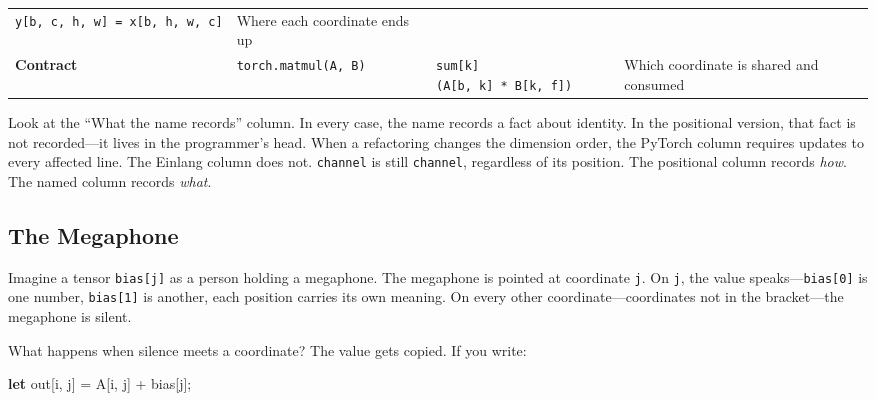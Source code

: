 \documentclass[11pt,titlepage]{article}
\newenvironment{Shaded}{}{}
\newcommand{\KeywordTok}[1]{\textcolor[rgb]{0.00,0.44,0.13}{\textbf{#1}}}
\newcommand{\NormalTok}[1]{#1}
\newcommand{\OperatorTok}[1]{\textcolor[rgb]{0.40,0.40,0.40}{#1}}
\begin{document}
\begin{longtable}[]{@{}llll@{}}
\begin{minipage}[t]{0.22\columnwidth}
\texttt{y{[}b,\ c,\ h,\ w{]}\ =\ x{[}b,\ h,\ w,\ c{]}}\strut
\end{minipage} & \begin{minipage}[t]{0.22\columnwidth}\raggedright
Where each coordinate ends up\strut
\end{minipage}\tabularnewline
\begin{minipage}[t]{0.22\columnwidth}\raggedright
\textbf{Contract}\strut
\end{minipage} & \begin{minipage}[t]{0.22\columnwidth}\raggedright
\texttt{torch.matmul(A,\ B)}\strut
\end{minipage} & \begin{minipage}[t]{0.22\columnwidth}\raggedright
\texttt{sum{[}k{]}(A{[}b,\ k{]}\ *\ B{[}k,\ f{]})}\strut
\end{minipage} & \begin{minipage}[t]{0.22\columnwidth}\raggedright
Which coordinate is shared and consumed\strut
\end{minipage}\tabularnewline
\bottomrule
\end{longtable}

Look at the ``What the name records'' column. In every case, the name
records a fact about identity. In the positional version, that fact is
not recorded---it lives in the programmer's head. When a refactoring
changes the dimension order, the PyTorch column requires updates to
every affected line. The Einlang column does not. \texttt{channel} is
still \texttt{channel}, regardless of its position. The positional
column records \emph{how}. The named column records \emph{what}.

\vspace{2em}

\hypertarget{the-megaphone}{%
\subsection{The Megaphone}\label{the-megaphone}}

Imagine a tensor \texttt{bias{[}j{]}} as a person holding a megaphone.
The megaphone is pointed at coordinate \texttt{j}. On \texttt{j}, the
value speaks---\texttt{bias{[}0{]}} is one number, \texttt{bias{[}1{]}}
is another, each position carries its own meaning. On every other
coordinate---coordinates not in the bracket---the megaphone is silent.

What happens when silence meets a coordinate? The value gets copied. If
you write:

\begin{Shaded}
\begin{Highlighting}[]
\KeywordTok{let}\NormalTok{ out}\OperatorTok{[}\NormalTok{i, j}\OperatorTok{]}\NormalTok{ = A}\OperatorTok{[}\NormalTok{i, j}\OperatorTok{]}\NormalTok{ + bias}\OperatorTok{[}\NormalTok{j}\OperatorTok{]}\NormalTok{;}
\end{Highlighting}
\end{Shaded}
\end{document}
